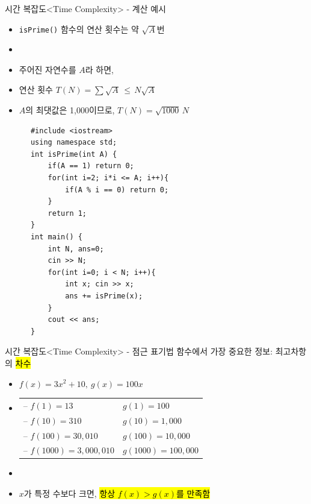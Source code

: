 \begin{frame}[fragile]{시간 복잡도}{<Time Complexity> - 계산 예시}
  \begin{center}
  \end{center}
  \vspace{2mm}
  \begin{twocol}
    \begin{itemize}
      \item \texttt{isPrime()} 함수의 연산 횟수는 약 $\sqrt{A}$번
      \item[] \vspace{1mm}
      \item 주어진 자연수를 $A$라 하면,
      \item 연산 횟수 $T(N) = \sum \sqrt{A}\, \le\, N\sqrt{A}$
      \item $A$의 최댓값은 1,000이므로, $T(N) = \sqrt{1000}\,N$
    \end{itemize}
  \colsplit
    \begin{verbatim}
      #include <iostream>
      using namespace std;
      int isPrime(int A) {
          if(A == 1) return 0;
          for(int i=2; i*i <= A; i++){
              if(A % i == 0) return 0;
          }
          return 1;
      }
      int main() {
          int N, ans=0;
          cin >> N;
          for(int i=0; i < N; i++){
              int x; cin >> x;
              ans += isPrime(x);
          }
          cout << ans;
      }
    \end{verbatim}
  \end{twocol}
\end{frame}

\begin{frame}{시간 복잡도}{<Time Complexity> - 점근 표기법}
  함수에서 가장 중요한 정보: \alert{최고차항의} \hl{차수}
  \vspace{3mm}
  \begin{itemize}
    \item $f(x) = 3x^2 + 10,\ g(x) = 100x$
    \item[] \hspace{2em}%
      \begin{tabular}{@{}ll@{}}
        – $f(1) = 13$          & $g(1) = 100$      \\
        – $f(10) = 310$        & $g(10) = 1{,}000$  \\
        – $f(100) = 30{,}010$  & $g(100) = 10{,}000$ \\
        – $f(1000) = 3{,}000{,}010$ & $g(1000) = 100{,}000$ \\
      \end{tabular}
    \item[] \vspace{2mm}
    \item $x$가 \alert{특정 수보다 크면,} \hl{항상 $f(x)>g(x)$를 만족함}
  \end{itemize}
\end{frame}

